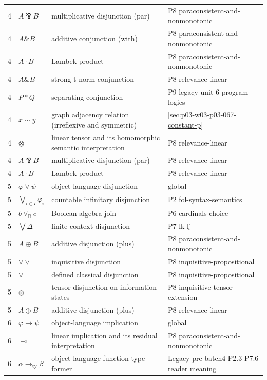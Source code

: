 \begin{longtable}{@{}p{}p{}p{}p{}@{}}
4 & \(A\bindnasrepma B\) & multiplicative disjunction (par) & P8 paraconsistent-and-nonmonotonic \\
4 & \(A\mathbin{\&}B\) & additive conjunction (with) & P8 paraconsistent-and-nonmonotonic \\
4 & \(A\mathbin{\cdot}B\) & Lambek product & P8 paraconsistent-and-nonmonotonic \\
4 & \(A\mathbin{\&}B\) & strong t-norm conjunction & P8 relevance-linear \\
4 & \(P*Q\) & separating conjunction & P9 legacy unit 6 program-logics \\
4 & \(x\sim y\) & graph adjacency relation (irreflexive and symmetric) & \hyperref[sec:p03-w03-p03-067-constant-p]{\ref*{sec:p03-w03-p03-067-constant-p}} \\
4 & \(\otimes\) & linear tensor and its homomorphic semantic interpretation & P8 relevance-linear \\
4 & \(A\bindnasrepma B\) & multiplicative disjunction (par) & P8 relevance-linear \\
4 & \(A\mathbin{\cdot}B\) & Lambek product & P8 relevance-linear \\
5 & \(\varphi\lor\psi\) & object-language disjunction & global \\
5 & \(\bigvee_{i\in I}\varphi_i\) & countable infinitary disjunction & P2 fol-syntax-semantics \\
5 & \(b\vee_{\mathbb B}c\) & Boolean-algebra join & P6 cardinals-choice \\
5 & \(\bigvee\Delta\) & finite context disjunction & P7 lk-lj \\
5 & \(A\oplus B\) & additive disjunction (plus) & P8 paraconsistent-and-nonmonotonic \\
5 & \(\mathbin{\vee\!\vee}\) & inquisitive disjunction & P8 inquisitive-propositional \\
5 & \(\lor\) & defined classical disjunction & P8 inquisitive-propositional \\
5 & \(\otimes\) & tensor disjunction on information states & P8 inquisitive tensor extension \\
5 & \(A\oplus B\) & additive disjunction (plus) & P8 relevance-linear \\
6 & \(\varphi\to\psi\) & object-language implication & global \\
6 & \(\multimap\) & linear implication and its residual interpretation & P8 paraconsistent-and-nonmonotonic \\
6 & \(\alpha\to_{\mathrm{ty}}\beta\) & object-language function-type former & Legacy pre-batch4 P2.3-P7.6 reader meaning \\

\end{longtable}
